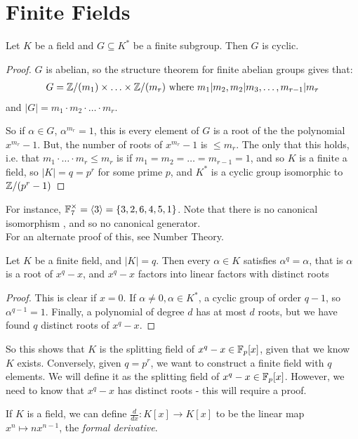 \documentclass[a4paper, 10pt, twocolumn]{amsart}
\begin{document}
\section{Finite Fields}
\begin{proposition}
Let $K$ be a field and $G\subseteq K^\ast$ be a finite subgroup. Then $G$ is cyclic.
\end{proposition}
\begin{proof}
$G$ is abelian, so the structure theorem for finite abelian groups gives that:
\begin{align*}
G = \mathbb{Z}/(m_1) \times \ldots \times \mathbb{Z}/(m_r) \text{ where } m_1|m_2, m_2|m_3, \ldots, m_{r-1}|m_r
\end{align*}
and $|G|=m_1\cdot m_2 \cdot\ldots\cdot m_r$.

So if $\alpha \in G$, $\alpha^{m_r} = 1$, this is every element of $G$ is a root of the the polynomial $x^{m_r} - 1$. But, the number of roots of $x^{m_r} -1$ is $\leq m_r$. The only that this holds, i.e. that $m_1\cdot\ldots\cdot m_r\leq m_r$ is if $m_1 = m_2 = \ldots = m_{r-1} = 1$, and so $K$ is a finite a field, so $|K| = q = p^r$ for some prime $p$, and $K^\ast$ is a cyclic group isomorphic to $\mathbb{Z}/(p^r-1)$
\end{proof}
For instance, $\mathbb{F}_7^\times = \langle 3\rangle = \{3,2,6,4,5,1\}$.  Note that there is no canonical isomorphism , and so no canonical generator.\\
For an alternate proof of this, see Number Theory.

\begin{lemma}
Let $K$ be a finite field, and $|K|=q$. Then every $\alpha\in K$ satisfies $\alpha^q = \alpha$, that is $\alpha$ is a root of $x^q - x$, and $x^q-x$ factors into linear factors with distinct roots
\end{lemma}
\begin{proof}
This is clear if $x=0$. If $\alpha\neq 0, \alpha\in K^\ast$, a cyclic group of order $q-1$, so $\alpha^{q-1} = 1$. Finally, a polynomial of degree $d$ has at most $d$ roots, but we have found $q$ distinct roots of $x^q-x$.
\end{proof}
So this shows that $K$ is the splitting field of $x^q-x \in \mathbb{F}_p[x]$, given that we know $K$ exists. Conversely, given $q = p^r$, we want to construct a finite field with $q$ elements. We will define it as the splitting field of $x^q-x\in \mathbb{F}_p[x]$. However, we need to know that $x^q-x$ has distinct roots - this will require a proof.

If $K$ is a field, we can define $\frac{d}{dx}:K[x] \rightarrow K[x]$ to be the linear map $x^n \mapsto nx^{n-1}$, the \emph{formal derivative}.
\end{document}

